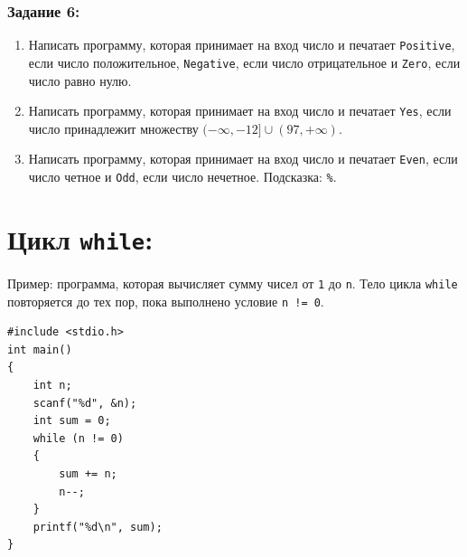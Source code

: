 \documentclass{article}
\begin{document}
\subsubsection*{Задание 6:}
\begin{enumerate}
\item Написать программу, которая принимает на вход число и печатает \texttt{Positive}, если число положительное, \texttt{Negative}, если число отрицательное и \texttt{Zero}, если число равно нулю.
\item Написать программу, которая принимает на вход число и печатает \texttt{Yes}, если число принадлежит множеству $(-\infty, -12] \cup (97, +\infty)$.
\item Написать программу, которая принимает на вход число и печатает \texttt{Even}, если число четное и \texttt{Odd}, если число нечетное. Подсказка: \texttt{\%}.
\end{enumerate}

\section*{Цикл \texttt{while}:}
Пример: программа, которая вычисляет сумму чисел от \texttt{1} до \texttt{n}. Тело цикла \texttt{while} повторяется до тех пор, пока выполнено условие \texttt{n != 0}.
\begin{lstlisting}
#include <stdio.h>
int main() 
{
    int n;
    scanf("%d", &n);
    int sum = 0;
    while (n != 0)
    {
        sum += n;
        n--;
    }
    printf("%d\n", sum);
}
\end{lstlisting}
\end{document}
